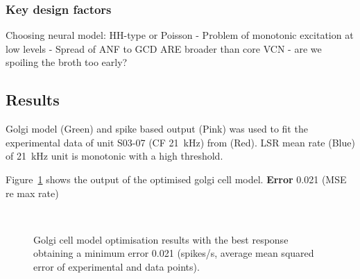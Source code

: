 \subsubsection{Key design factors}

Choosing neural model: HH-type or Poisson
 - Problem of monotonic excitation at low levels
 - Spread of ANF to GCD ARE broader than core VCN
  - are we spoiling the broth too early? 



\newpage






\clearpage
\subsection{Results}

Golgi model (Green) and spike based output (Pink) was used to
fit the experimental data of unit S03-07 (CF 21~kHz) from
\citep{GhoshalKim:1996} (Red).  LSR mean rate (Blue) of 21~kHz unit is
monotonic with a high threshold.

Figure~\ref{fig:GolgiResult} shows the output of the optimised golgi cell model.
\textbf{Error} 0.021 (MSE re max rate)


\begin{figure}[htb]
  \centering %
   \\
  \caption{Golgi cell model optimisation results with the best response obtaining a minimum error 0.021 (spikes/s, average mean squared error of experimental and data points). }\label{fig:GolgiResult}
\end{figure}



